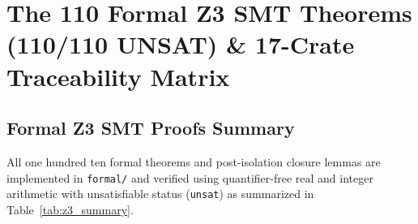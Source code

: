 \documentclass[11pt,onecolumn]{article}
\begin{document}
\FloatBarrier

\section{The 110 Formal Z3 SMT Theorems (110/110 UNSAT) \& 17-Crate Traceability Matrix}
\label{sec:smt_theorems_94}

\subsection{Formal Z3 SMT Proofs Summary}
All one hundred ten formal theorems and post-isolation closure lemmas are implemented in \texttt{formal/} and verified using quantifier-free real and integer arithmetic with unsatisfiable status (\texttt{unsat}) as summarized in Table~\ref{tab:z3_summary}.
\end{document}
